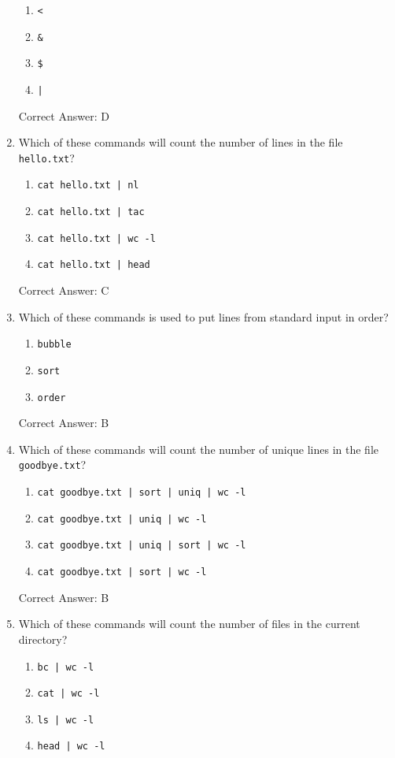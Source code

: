 \documentclass{article}
\begin{document}
\begin{enumerate}
    \begin{enumerate}
        \item \texttt{<}
        \item \texttt{\&}
        \item \texttt{\$}
        \item \texttt{|}
    \end{enumerate}
    Correct Answer: D
    \item Which of these commands will count the number of lines in the file \texttt{hello.txt}?
    \begin{enumerate}
        \item \texttt{cat hello.txt | nl}
        \item \texttt{cat hello.txt | tac}
        \item \texttt{cat hello.txt | wc -l}
        \item \texttt{cat hello.txt | head}
    \end{enumerate}
    Correct Answer: C
    \item Which of these commands is used to put lines from standard input in order?
    \begin{enumerate}
        \item \texttt{bubble}
        \item \texttt{sort}
        \item \texttt{order}
    \end{enumerate}
    Correct Answer: B
    \item Which of these commands will count the number of unique lines in the file \texttt{goodbye.txt}?
    \begin{enumerate}
        \item \texttt{cat goodbye.txt | sort | uniq | wc -l}
        \item \texttt{cat goodbye.txt | uniq | wc -l}
        \item \texttt{cat goodbye.txt | uniq | sort | wc -l}
        \item \texttt{cat goodbye.txt | sort | wc -l}
    \end{enumerate}
    Correct Answer: B
    \item Which of these commands will count the number of files in the current directory?
    \begin{enumerate}
        \item \texttt{bc | wc -l}
        \item \texttt{cat | wc -l}
        \item \texttt{ls | wc -l}
        \item \texttt{head | wc -l}

\end{enumerate}
\end{enumerate}
\end{document}
